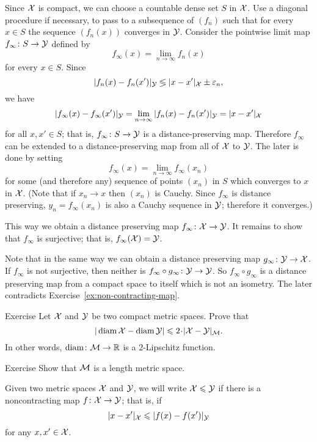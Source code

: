 Since $\mathcal{X}$ is compact, 
we can choose a countable dense set
$S$ in $\mathcal{X}$.
Use a diagonal procedure if necessary, to pass to a subsequence of $(f_n)$
such that for every $x \in S$ the sequence $(f_n(x))$ 
converges in $\mathcal{Y}$. 
Consider the pointwise limit map  $f_\infty \colon S \to \mathcal{Y}$ defined by
 $$f_\infty(x) = \lim_{n\to\infty} f_n (x)$$ for every $x \in S$. 
Since $$|f_n (x)- f_n (x')|_{\mathcal{Y}}\lessgtr |x- x'|_{\mathcal{X}} \pm\varepsilon_n,$$ 
we have 
$$|f_\infty(x)-f_\infty (x')|_{\mathcal{Y}} 
= \lim_{n\to\infty} |f_n(x)-f_n (x')|_{\mathcal{Y}} 
= |x -x'|_{\mathcal{X}}$$ for all
$x, x' \in S$; 
that is, $f_\infty\colon S\to \mathcal{Y}$ is a distance-preserving map. 
Therefore $f_\infty$ can be extended to a distance-preserving map from all of $\mathcal{X}$ to $\mathcal{Y}$.
The later is done by setting 
$$f_\infty(x)=\lim_{n\to\infty} f_\infty(x_n)$$ 
for some (and therefore any) sequence of points $(x_n)$ in $S$
which converges to $x$ in $\mathcal{X}$.
(Note that if $x_n\to x$ then $(x_n)$ is Cauchy.
Since $f_\infty$ is distance preserving, $y_n=f_\infty(x_n)$ is also a Cauchy sequence in $\mathcal{Y}$;
therefore it converges.)

This way we obtain a distance preserving map $f_\infty\colon\mathcal{X}\to \mathcal{Y}$. 
It remains to show that $f_\infty$ is surjective; that is, $f_\infty(\mathcal{X})=\mathcal{Y}$.

Note that in the same way we can obtain a distance preserving map $g_\infty\:\spc{Y}\z\to \spc{X}$.
If $f_\infty$ is not surjective, then neither is $f_\infty\circ g_\infty\colon\mathcal{Y}\to \mathcal{Y}$.
So $f_\infty \circ g_\infty$ is a distance preserving map from a compact space to itself which is not an isometry.
The later contradicts Exercise~\ref{ex:non-contracting-map}. 
\qeds

\begin{thm}{Exercise}\label{ex:d_GH-and-diam}
 Let $\mathcal{X}$ and $\mathcal{Y}$ be two compact metric spaces.
Prove that 
$$|\diam \spc{X} - \diam \spc{Y} |\le 2\cdot |\spc{X}-\spc{Y}|_{\spc{M}}.$$
In other words, $\operatorname{\rm diam}\nolimits\colon\mathcal{M}\to\mathbb{R}$ is a $2$-Lipschitz function.
\end{thm}

\begin{thm}{Exercise}
Show that $\mathcal{M}$ is a length metric space.
\end{thm}

Given two metric spaces $\mathcal{X}$ and $\mathcal{Y}$, we will write $\mathcal{X}\leqslant \mathcal{Y}$ if there is a noncontracting map $f\colon\mathcal{X}\to \mathcal{Y}$;
that is, if 
$$ |x-x'|_{\mathcal{X}}\leqslant|f(x)-f(x')|_{\mathcal{Y}}$$
for any $x,x'\in \mathcal{X}$.


